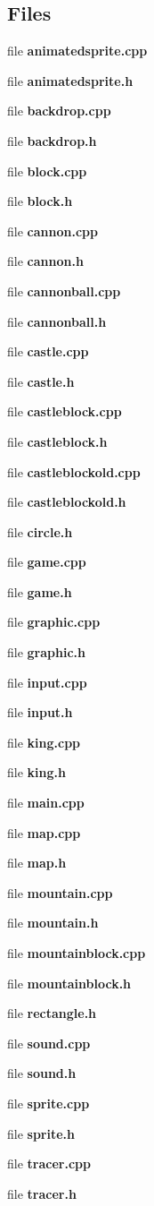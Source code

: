 \subsection*{Files}
\begin{DoxyCompactItemize}
\item 
file {\bfseries animatedsprite.\+cpp}
\item 
file {\bfseries animatedsprite.\+h}
\item 
file {\bfseries backdrop.\+cpp}
\item 
file {\bfseries backdrop.\+h}
\item 
file {\bfseries block.\+cpp}
\item 
file {\bfseries block.\+h}
\item 
file {\bfseries cannon.\+cpp}
\item 
file {\bfseries cannon.\+h}
\item 
file {\bfseries cannonball.\+cpp}
\item 
file {\bfseries cannonball.\+h}
\item 
file {\bfseries castle.\+cpp}
\item 
file {\bfseries castle.\+h}
\item 
file {\bfseries castleblock.\+cpp}
\item 
file {\bfseries castleblock.\+h}
\item 
file {\bfseries castleblockold.\+cpp}
\item 
file {\bfseries castleblockold.\+h}
\item 
file {\bfseries circle.\+h}
\item 
file {\bfseries game.\+cpp}
\item 
file {\bfseries game.\+h}
\item 
file {\bfseries graphic.\+cpp}
\item 
file {\bfseries graphic.\+h}
\item 
file {\bfseries input.\+cpp}
\item 
file {\bfseries input.\+h}
\item 
file {\bfseries king.\+cpp}
\item 
file {\bfseries king.\+h}
\item 
file {\bfseries main.\+cpp}
\item 
file {\bfseries map.\+cpp}
\item 
file {\bfseries map.\+h}
\item 
file {\bfseries mountain.\+cpp}
\item 
file {\bfseries mountain.\+h}
\item 
file {\bfseries mountainblock.\+cpp}
\item 
file {\bfseries mountainblock.\+h}
\item 
file {\bfseries rectangle.\+h}
\item 
file {\bfseries sound.\+cpp}
\item 
file {\bfseries sound.\+h}
\item 
file {\bfseries sprite.\+cpp}
\item 
file {\bfseries sprite.\+h}
\item 
file {\bfseries tracer.\+cpp}
\item 
file {\bfseries tracer.\+h}
\end{DoxyCompactItemize}
